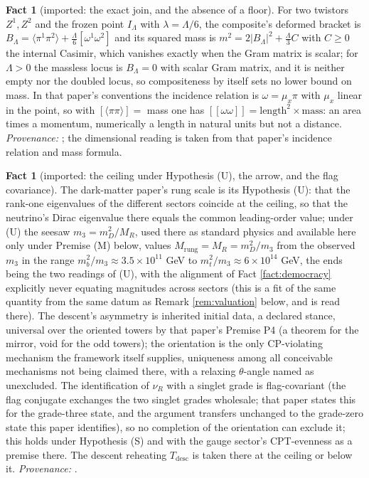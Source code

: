\documentclass[11pt]{article}
\theoremstyle{definition}
\newtheorem{fact}[theorem]{Fact}
\newcommand{\br}[1]{\langle #1\rangle}
\begin{document}
\begin{fact}[imported: the exact join, and the absence of a floor]\label{fact:join}
For two twistors $Z^{1}, Z^{2}$ and the frozen point $I_{\Lambda}$ with $\lambda = \Lambda/6$, the composite's deformed bracket is $B_{\Lambda} = \br{\pi^{1}\pi^{2}} + \tfrac{\Lambda}{6}[\omega^{1}\omega^{2}]$ and its squared mass is $m^{2} = 2|B_{\Lambda}|^{2} + \tfrac{\Lambda}{3}C$ with $C \ge 0$ the internal Casimir, which vanishes exactly when the Gram matrix is scalar; for $\Lambda > 0$ the massless locus is $B_{\Lambda} = 0$ with scalar Gram matrix, and it is neither empty nor the doubled locus, so compositeness by itself sets no lower bound on mass. In that paper's conventions the incidence relation is $\omega = \mu_{x}\pi$ with $\mu_{x}$ linear in the point, so with $[\br{\pi\pi}] = $ mass one has $[[\omega\omega]] = \text{length}^{2} \times \text{mass}$: an area times a momentum, numerically a length in natural units but not a distance. \emph{Provenance:} \cite[Thm.~5.6(1), (2), (5), Rem.~5.10]{ButlerT11}; the dimensional reading is taken from that paper's incidence relation and mass formula.
\end{fact}

\begin{fact}[imported: the ceiling under Hypothesis (U), the arrow, and the flag covariance]\label{fact:ceiling}
The dark-matter paper's rung scale is its Hypothesis (U): that the rank-one eigenvalues of the different sectors coincide at the ceiling, so that the neutrino's Dirac eigenvalue there equals the common leading-order value; under (U) the seesaw $m_{3} = m_{D}^{2}/M_{R}$, used there as standard physics and available here only under Premise (M) below, values $M_{\mathrm{rung}} = M_{R} = m_{D}^{2}/m_{3}$ from the observed $m_{3}$ in the range $m_{b}^{2}/m_{3} \approx 3.5 \times 10^{11}$ GeV to $m_{t}^{2}/m_{3} \approx 6 \times 10^{14}$ GeV, the ends being the two readings of (U), with the alignment of Fact \ref{fact:democracy} explicitly never equating magnitudes across sectors (this is a fit of the same quantity from the same datum as Remark \ref{rem:valuation} below, and is read there). The descent's asymmetry is inherited initial data, a declared stance, universal over the oriented towers by that paper's Premise P4 (a theorem for the mirror, void for the odd towers); the orientation is the only CP-violating mechanism the framework itself supplies, uniqueness among all conceivable mechanisms not being claimed there, with a relaxing $\theta$-angle named as unexcluded. The identification of $\nu_{R}$ with a singlet grade is flag-covariant (the flag conjugate exchanges the two singlet grades wholesale; that paper states this for the grade-three state, and the argument transfers unchanged to the grade-zero state this paper identifies), so no completion of the orientation can exclude it; this holds under Hypothesis (S) and with the gauge sector's CPT-evenness as a premise there. The descent reheating $T_{\mathrm{desc}}$ is taken there at the ceiling or below it. \emph{Provenance:} \cite[Prop.~6.4, Prop.~5.1, Prop.~5.2, App.~A]{ButlerT14}.
\end{fact}
\end{document}
